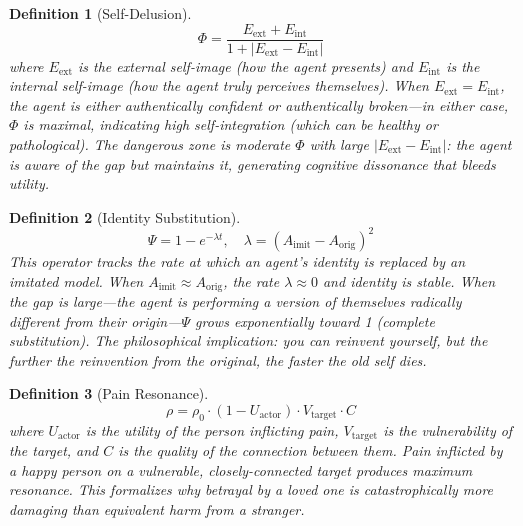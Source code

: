 \documentclass[12pt, a4paper]{article}
\newtheorem{definition}{Definition}[section]
\theoremstyle{remark}
\begin{document}
\begin{definition}[Self-Delusion]\label{def:phi}
\begin{equation}
    \Phi = \frac{E_{\text{ext}} + E_{\text{int}}}{1 + |E_{\text{ext}} - E_{\text{int}}|}
\end{equation}
where $E_{\text{ext}}$ is the external self-image (how the agent presents)
and $E_{\text{int}}$ is the internal self-image (how the agent truly
perceives themselves). When $E_{\text{ext}} = E_{\text{int}}$, the agent
is either authentically confident or authentically broken---in either case,
$\Phi$ is maximal, indicating high self-integration (which can be healthy
or pathological). The dangerous zone is moderate $\Phi$ with large
$|E_{\text{ext}} - E_{\text{int}}|$: the agent is aware of the gap but
maintains it, generating cognitive dissonance that bleeds utility.
\end{definition}

\begin{definition}[Identity Substitution]\label{def:psi}
\begin{equation}
    \Psi = 1 - e^{-\lambda t}, \quad \lambda = (A_{\text{imit}} - A_{\text{orig}})^2
\end{equation}
This operator tracks the rate at which an agent's identity is replaced by
an imitated model. When $A_{\text{imit}} \approx A_{\text{orig}}$, the rate
$\lambda \approx 0$ and identity is stable. When the gap is large---the
agent is performing a version of themselves radically different from their
origin---$\Psi$ grows exponentially toward 1 (complete substitution).
The philosophical implication: you can reinvent yourself, but the further
the reinvention from the original, the faster the old self dies.
\end{definition}

\begin{definition}[Pain Resonance]\label{def:rho}
\begin{equation}
    \rho = \rho_0 \cdot (1 - U_{\text{actor}}) \cdot V_{\text{target}} \cdot C
\end{equation}
where $U_{\text{actor}}$ is the utility of the person inflicting pain,
$V_{\text{target}}$ is the vulnerability of the target, and $C$ is the
quality of the connection between them. Pain inflicted by a happy person
on a vulnerable, closely-connected target produces maximum resonance.
This formalizes why betrayal by a loved one is catastrophically more
damaging than equivalent harm from a stranger.
\end{definition}
\end{document}
